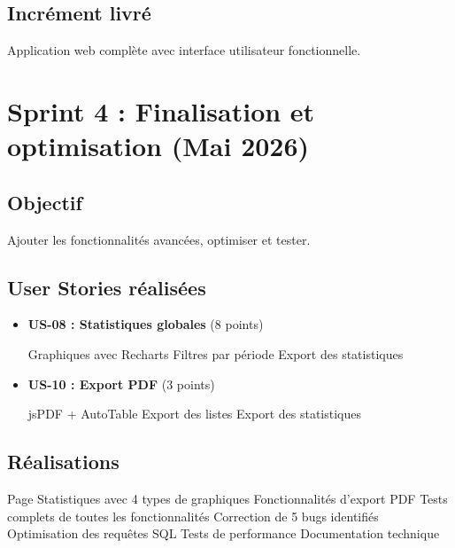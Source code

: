 \documentclass[12pt,a4paper]{report}
\begin{document}
\subsection*{Incrément livré}
Application web complète avec interface utilisateur fonctionnelle.

\section*{Sprint 4 : Finalisation et optimisation (Mai 2026)}

\subsection*{Objectif}
Ajouter les fonctionnalités avancées, optimiser et tester.

\subsection*{User Stories réalisées}

\begin{itemize}[leftmargin=1cm]
    \item \textbf{US-08 : Statistiques globales} (8 points)
    \begin{itemize}
        \composants Graphiques avec Recharts
        \composants Filtres par période
        \composants Export des statistiques
    \end{itemize}
    
    \item \textbf{US-10 : Export PDF} (3 points)
    \begin{itemize}
        \composants jsPDF + AutoTable
        \composants Export des listes
        \composants Export des statistiques
    \end{itemize}
\end{itemize}

\subsection*{Réalisations}

\begin{itemize}[leftmargin=1cm]
    \composants Page Statistiques avec 4 types de graphiques
    \composants Fonctionnalités d'export PDF
    \composants Tests complets de toutes les fonctionnalités
    \composants Correction de 5 bugs identifiés
    \composants Optimisation des requêtes SQL
    \composants Tests de performance
    \composants Documentation technique
\end{itemize}
\end{document}
